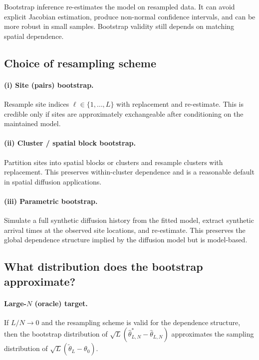 \documentclass[11pt]{article}
\begin{document}
Bootstrap inference re-estimates the model on resampled data. It can avoid
explicit Jacobian estimation, produce non-normal confidence intervals, and can
be more robust in small samples. Bootstrap validity still depends on matching
spatial dependence.

\subsection{Choice of resampling scheme}

\paragraph{(i) Site (pairs) bootstrap.}
Resample site indices $\ell\in\{1,\ldots,L\}$ with replacement and re-estimate.
This is credible only if sites are approximately exchangeable after
conditioning on the maintained model.

\paragraph{(ii) Cluster / spatial block bootstrap.}
Partition sites into spatial blocks or clusters and resample clusters with
replacement. This preserves within-cluster dependence and is a reasonable
default in spatial diffusion applications.

\paragraph{(iii) Parametric bootstrap.}
Simulate a full synthetic diffusion history from the fitted model, extract
synthetic arrival times at the observed site locations, and re-estimate. This
preserves the global dependence structure implied by the diffusion model but is
model-based.

\subsection{What distribution does the bootstrap approximate?}

\paragraph{Large-$N$ (oracle) target.}
If $L/N\to 0$ and the resampling scheme is valid for the dependence structure,
then the bootstrap distribution of
$\sqrt{L}(\hat\theta^*_{L,N}-\hat\theta_{L,N})$ approximates the sampling
distribution of $\sqrt{L}(\tilde\theta_L-\theta_0)$.
\end{document}
